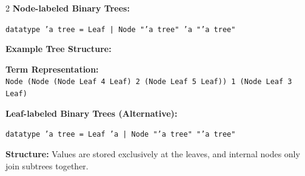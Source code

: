 \documentclass[10pt,a4paper]{article}
\begin{document}
\vspace{0.3em}

\begin{tcolorbox}[title={3. Binary Trees}]
\begin{multicols}{2}
\textbf{Node-labeled Binary Trees:}
\begin{center}
\texttt{datatype 'a tree = Leaf | Node "'a tree" 'a "'a tree"}
\end{center}

\textbf{Example Tree Structure:}
\begin{center}
\end{center}
\textbf{Term Representation:} \\
\texttt{Node (Node (Node Leaf 4 Leaf) 2 (Node Leaf 5 Leaf)) 1 (Node Leaf 3 Leaf)}

\columnbreak

\textbf{Leaf-labeled Binary Trees (Alternative):}
\begin{center}
\texttt{datatype 'a tree = Leaf 'a | Node "'a tree" "'a tree"}
\end{center}

\textbf{Structure:}
Values are stored exclusively at the leaves, and internal nodes only join subtrees together.
\end{multicols}
\end{tcolorbox}
\end{document}
